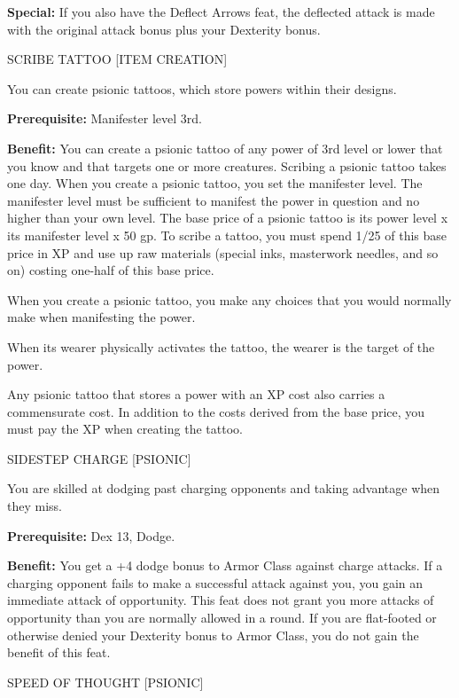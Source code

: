 \documentclass{article}
\begin{document}
\textbf{Special:} If you also have the Deflect Arrows feat, the deflected attack 
is made with the original attack bonus plus your Dexterity bonus.

\vspace{12pt}
SCRIBE TATTOO [ITEM CREATION]

You can create psionic tattoos, which store powers within their designs.

\textbf{Prerequisite:} Manifester level 3rd.

\textbf{Benefit:} You can create a psionic tattoo of any power of 3rd level or 
lower that you know and that targets one or more creatures. Scribing a psionic 
tattoo takes one day. When you create a psionic tattoo, you set the manifester 
level. The manifester level must be sufficient to manifest the power in question 
and no higher than your own level. The base price of a psionic tattoo is its power 
level x its manifester level x 50 gp. To scribe a tattoo, you must spend 1/25 of 
this base price in XP and use up raw materials (special inks, masterwork needles, 
and so on) costing one-half of this base price.

When you create a psionic tattoo, you make any choices that you would normally 
make when manifesting the power.

When its wearer physically activates the tattoo, the wearer is the target of the 
power.

Any psionic tattoo that stores a power with an XP cost also carries a commensurate 
cost. In addition to the costs derived from the base price, you must pay the XP 
when creating the tattoo.

\vspace{12pt}
SIDESTEP CHARGE [PSIONIC]

You are skilled at dodging past charging opponents and taking advantage when they 
miss.

\textbf{Prerequisite:} Dex 13, Dodge.

\textbf{Benefit:} You get a +4 dodge bonus to Armor Class against charge attacks. 
If a charging opponent fails to make a successful attack against you, you gain 
an immediate attack of opportunity. This feat does not grant you more attacks of 
opportunity than you are normally allowed in a round. If you are flat-footed or 
otherwise denied your Dexterity bonus to Armor Class, you do not gain the benefit 
of this feat.

\vspace{12pt}
SPEED OF THOUGHT [PSIONIC]
\end{document}
